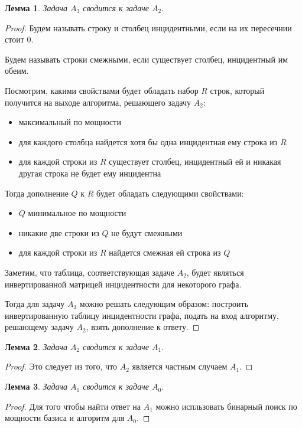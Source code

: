 \documentclass[a4paper,14pt]{extreport}
\newtheorem{lm}{Лемма}
\begin{document}
\begin{lm}
Задача $A_3$ сводится к задаче $A_2$.
\end{lm}
\begin{proof}
Будем называть строку и столбец инцидентными, если на их пересечнии стоит 0. 

Будем называть строки смежными, если существует столбец, инцидентный им обеим.

Посмотрим, какими свойствами будет обладать набор $R$ строк, который получится на выходе алгоритма, решающего задачу $A_2$:
\begin{itemize}
\item максимальный по мощности    
\item для каждого столбца найдется хотя бы одна инцидентная ему строка из $R$
\item для каждой строки из $R$ существует столбец, инцидентный ей и никакая другая строка не будет ему инцидентна     
\end{itemize}

Тогда дополнение $Q$ к $R$ будет обладать следующими свойствами:
\begin{itemize}
\item $Q$ минимальное по мощности    
\item никакие две строки из $Q$ не будут смежными
\item для каждой строки из $R$ найдется смежная ей строка из $Q$     
\end{itemize}

Заметим, что таблица, соответствующая задаче $A_2$, будет являться инвертированной матрицей инцидентности для некоторого графа.

Тогда для задачу $A_3$ можно решать следующим образом: построить инвертированную таблицу инцидентности графа, подать на вход алгоритму, решающему задачу $A_2$, взять дополнение к ответу.
\end{proof}

\begin{lm}
Задача $A_2$ сводится к задаче $A_1$.
\end{lm}
\begin{proof}
Это следует из того, что $A_2$ является частным случаем $A_1$.
\end{proof}

\begin{lm}
Задача $A_1$ сводится к задаче $A_0$.
\end{lm}
\begin{proof}
Для того чтобы найти ответ на $A_1$ можно испльзовать бинарный поиск по мощности базиса и алгоритм для $A_0$.
\end{proof}
\end{document}
